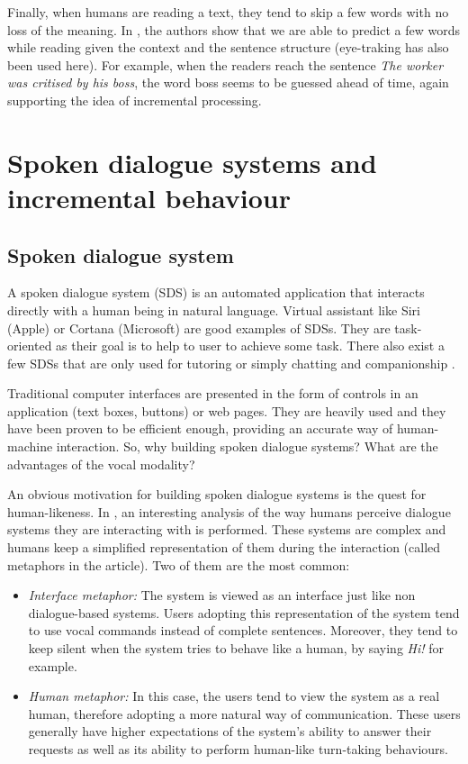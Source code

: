            Finally, when humans are reading a text, they tend to skip a few words with no loss of the meaning. In \cite{Ilkin2011}, the authors show that we are able to predict a few words while reading given the context and the sentence structure (eye-traking has also been used here). For example, when the readers reach the sentence \textit{The worker was critised by his boss}, the word boss seems to be guessed ahead of time, again supporting the idea of incremental processing.


\section{Spoken dialogue systems and incremental behaviour}
    
	\subsection{Spoken dialogue system}
        \label{soa:sds}
        
	A spoken dialogue system (SDS) is an automated application that interacts directly with a human being in natural language. Virtual assistant like Siri (Apple) or Cortana (Microsoft) are good examples of SDSs. They are task-oriented as their goal is to help to user to achieve some task. There also exist a few SDSs that are only used for tutoring \cite{Daubigney2013} or simply chatting and companionship \cite{Sidner2013}.
	
	Traditional computer interfaces are presented in the form of controls in an application (text boxes, buttons) or web pages. They are heavily used and they have been proven to be efficient enough, providing an accurate way of human-machine interaction. So, why building spoken dialogue systems? What are the advantages of the vocal modality?
		
	An obvious motivation for building spoken dialogue systems is the quest for human-likeness. In \cite{Edlund2008}, an interesting analysis of the way humans perceive dialogue systems they are interacting with is performed. These systems are complex and humans keep a simplified representation of them during the interaction (called metaphors in the article). Two of them are the most common:
	
	\begin{itemize}
		\item \textit{Interface metaphor:} The system is viewed as an interface just like non dialogue-based systems. Users adopting this representation of the system tend to use vocal commands instead of complete sentences. Moreover, they tend to keep silent when the system tries to behave like a human, by saying \textit{Hi!} for example.
		\item \textit{Human metaphor:} In this case, the users tend to view the system as a real human, therefore adopting a more natural way of communication. These users generally have higher expectations of the system's ability to answer their requests as well as its ability to perform human-like turn-taking behaviours.
	\end{itemize}
	
